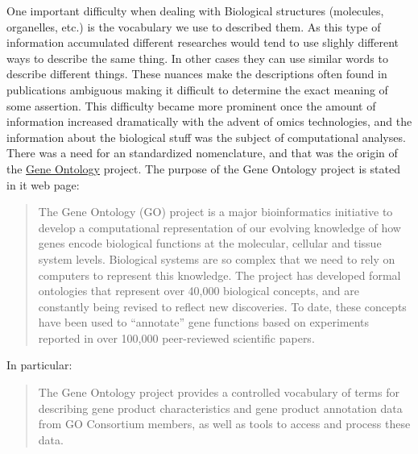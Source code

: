 \documentclass[]{book}
\theoremstyle{definition}
\theoremstyle{definition}
\theoremstyle{definition}
\theoremstyle{remark}
\begin{document}
One important difficulty when dealing with Biological structures
(molecules, organelles, etc.) is the vocabulary we use to described
them. As this type of information accumulated different researches would
tend to use slighly different ways to describe the same thing. In other
cases they can use similar words to describe different things. These
nuances make the descriptions often found in publications ambiguous
making it difficult to determine the exact meaning of some assertion.
This difficulty became more prominent once the amount of information
increased dramatically with the advent of omics technologies, and the
information about the biological stuff was the subject of computational
analyses. There was a need for an standardized nomenclature, and that
was the origin of the \href{http://www.geneontology.org}{Gene Ontology}
project. The purpose of the Gene Ontology project is stated in it web
page:

\begin{quote}
The Gene Ontology (GO) project is a major bioinformatics initiative to
develop a computational representation of our evolving knowledge of how
genes encode biological functions at the molecular, cellular and tissue
system levels. Biological systems are so complex that we need to rely on
computers to represent this knowledge. The project has developed formal
ontologies that represent over 40,000 biological concepts, and are
constantly being revised to reflect new discoveries. To date, these
concepts have been used to ``annotate'' gene functions based on
experiments reported in over 100,000 peer-reviewed scientific papers.
\end{quote}

In particular:

\begin{quote}
The Gene Ontology project provides a controlled vocabulary of terms for
describing gene product characteristics and gene product annotation data
from GO Consortium members, as well as tools to access and process these
data.
\end{quote}
\end{document}
